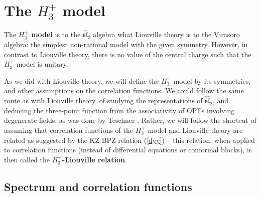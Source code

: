 \documentclass[12pt,a4paper,notitlepage]{report}
\numberwithin{equation}{section}
\theoremstyle{break}
\begin{document}
\section{The \texorpdfstring{$H_3^+$}{H3+} model \label{sechtp}}

The \textbf{\boldmath $H_3^+$ model} is to the $\widehat{\mathfrak{sl}}_2$ algebra what Liouville theory is to the Virasoro algebra: the simplest non-rational model with the given symmetry. However, in contrast to Liouville theory, there is no value of the central charge such that the $H_3^+$ model is unitary. 

As we did with Liouville theory, we will define the $H_3^+$ model by its symmetries, and other assumptions on the correlation functions. We could follow the same route as with Liouville theory, of studying the representations of $\widehat{\mathfrak{sl}}_2$, and deducing the three-point function from the associativity of OPEs involving degenerate fields, as was done by Teschner \cite{tes97a}. Rather, we will follow the shortcut of assuming that correlation functions of the $H_3^+$ model and Liouville theory are related as suggested by the KZ-BPZ relation (\ref{dyy}) -- this relation, when applied to correlation functions (instead of differential equations or conformal blocks), is then called the \textbf{\boldmath $H_3^+$-Liouville relation}.


\subsection{Spectrum and correlation functions}
\end{document}
